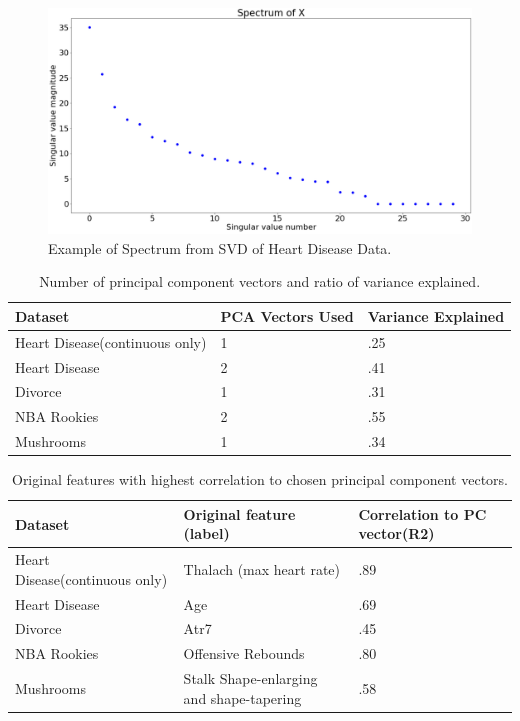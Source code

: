 \documentclass{article}
\begin{document}
\begin{figure}
	\includegraphics[width=\linewidth]{spectrumHD.png}
	\caption{Example of Spectrum from SVD of Heart Disease Data.}
\end{figure}


\begin{table}
  \caption{Number of principal component vectors and ratio of variance explained.}
  \centering
  \begin{tabular}{lll}
    \toprule
    \midrule
    Dataset     & PCA Vectors Used       & Variance Explained \\
    \midrule
    \midrule
    Heart Disease(continuous only) & 1 & .25     \\
    \midrule
    Heart Disease & 2 & .41     \\
    \midrule
    Divorce     & 1 & .31    \\
    \midrule
    NBA Rookies     & 2   & .55 \\
    \midrule
    Mushrooms     & 1   & .34 \\
    \bottomrule
  \end{tabular}
\end{table}

\begin{table}
	\caption{ Original features with highest correlation to chosen principal component vectors.}
	\centering
	\begin{tabular}{lll}
    \toprule
	\midrule
	Dataset     & Original feature (label)     & Correlation to PC vector(R2) \\
	\midrule
	\midrule
	Heart Disease(continuous only) & Thalach (max heart rate) & .89     \\
	\midrule
	Heart Disease & Age & .69     \\
	\midrule
	Divorce     & Atr7  & .45    \\
	\midrule
	NBA Rookies     & Offensive Rebounds   & .80 \\
	\midrule
	Mushrooms     & Stalk Shape-enlarging and shape-tapering   & .58 \\
	\bottomrule
	\end{tabular}
\end{table}
\end{document}
